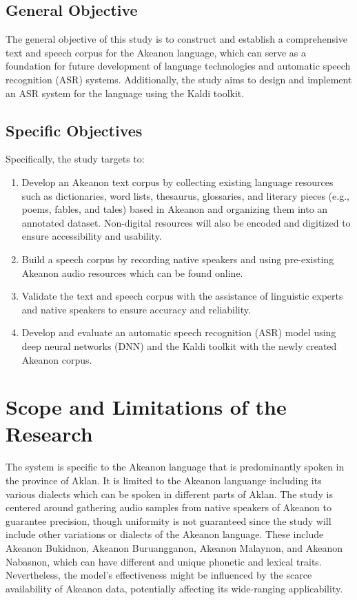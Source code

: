 \subsection{General Objective}
\label{sec:generalobjective}

The general objective of this study is to construct and establish a comprehensive text and speech corpus for the Akeanon language, which can serve as a foundation for future development of language technologies and automatic speech recognition (ASR) systems. Additionally, the study aims to design and implement an ASR system for the language using the Kaldi toolkit.


\subsection{Specific Objectives}
\label{sec:specificobjectives}

Specifically, the study targets to:
\begin{enumerate}
    \item Develop an Akeanon text corpus by collecting existing language resources such as dictionaries, word lists, thesaurus, glossaries, and literary pieces (e.g., poems, fables, and tales) based in Akeanon and organizing them into an annotated dataset. Non-digital resources will also be encoded and digitized to ensure accessibility and usability.
    \item Build a speech corpus by recording native speakers and using pre-existing Akeanon audio resources which can be found online.
    \item Validate the text and speech corpus with the assistance of linguistic experts and native speakers to ensure accuracy and reliability.
    \item Develop and evaluate an automatic speech recognition (ASR) model using deep neural networks (DNN) and the Kaldi toolkit with the newly created Akeanon corpus.
 \end{enumerate}
 
\section{Scope and Limitations of the Research}
\label{sec:scopelimitations}

The system is specific to the Akeanon language that is predominantly spoken in the province of Aklan. It is limited to the Akeanon languange including its various dialects which can be spoken in different parts of Aklan. The study is centered around gathering audio samples from native speakers of Akeanon to guarantee precision, though uniformity is not guaranteed since the study will include other variations or dialects of the Akeanon language. These include Akeanon Bukidnon, Akeanon Buruangganon, Akeanon Malaynon, and Akeanon Nabasnon, which can have different and unique phonetic and lexical traits. Nevertheless, the model's effectiveness might be influenced by the scarce availability of Akeanon data, potentially affecting its wide-ranging applicability.


